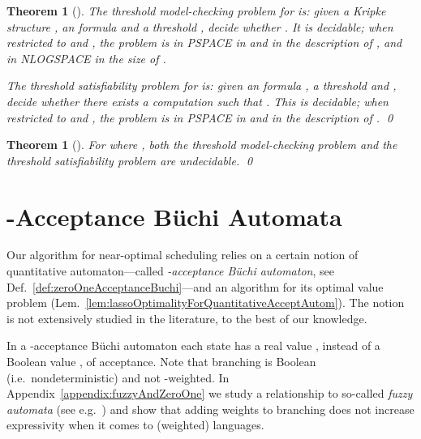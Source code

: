\documentclass[a4paper,USenglish,numberwithinsect]{lipics}
\theoremstyle{definition}
\theoremstyle{remark}
\theoremstyle{plain}
\newtheorem{thm}[defi]{Theorem}
\begin{document}
\begin{thm}[\cite{AlmagorBK14}]\label{thm:thresholdModelCheckingDecidable}
 The \emph{threshold model-checking problem} for  is:
given a
 Kripke structure , an  formula  and a threshold ,  decide whether . It
 is decidable; when restricted to  and , the problem is in PSPACE in  and in the description of  , and in NLOGSPACE in the
 size of . 


 The \emph{threshold satisfiability problem} for  is:
given an  formula , a threshold 
and   , decide whether there exists a computation  such that . This is decidable; when restricted to  
and , the problem is in PSPACE in  and in the description of  . \qed
\end{thm}
\begin{thm}[\cite{AlmagorBK14}]\label{thm:averageUndecidable}
  For  where , both the
 threshold model-checking problem and the threshold satisfiability problem are undecidable.
 \qed
\end{thm}













\section{-Acceptance B\"uchi Automata}
\label{sec:zeroOneAutomata}

Our algorithm for near-optimal scheduling relies on a certain
notion of quantitative automaton---called \emph{-acceptance B\"uchi
automaton}, see Def.~\ref{def:zeroOneAcceptanceBuchi}---and an algorithm for its optimal value problem
(Lem.~\ref{lem:lassoOptimalityForQuantitativeAcceptAutom}).
The notion is not
extensively studied in the literature,   to the best of our knowledge.

In a -acceptance B\"uchi
automaton 
each state has a real value
,
instead of 
a Boolean value
 , of acceptance.
Note that branching is Boolean (i.e.\ nondeterministic) and not
-weighted. 
 In Appendix~\ref{appendix:fuzzyAndZeroOne}
we study a relationship to so-called \emph{fuzzy automata} (see
e.g.~\cite{Rahonis05}) and
show
that adding weights to branching does not increase expressivity when it
comes to (weighted) languages.
\end{document}
